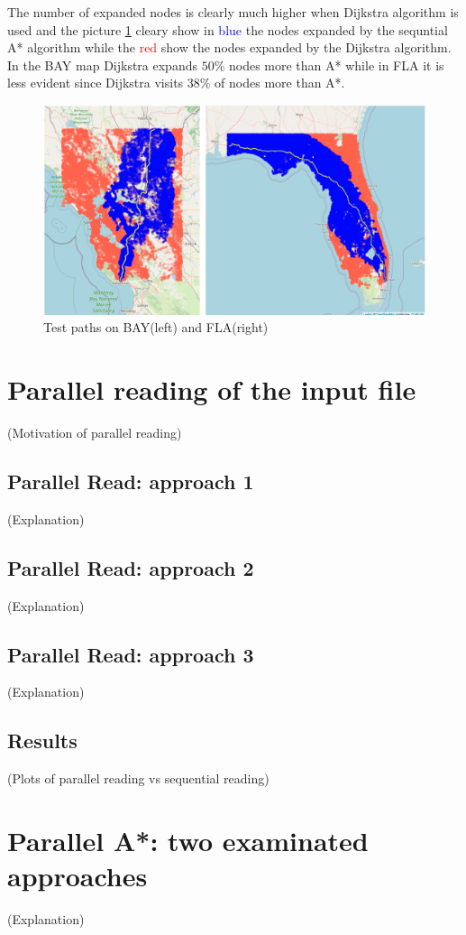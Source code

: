 \documentclass[twocolumn, switch]{article} %
\begin{document}
The number of expanded nodes is clearly much higher when Dijkstra algorithm is used and the picture
\ref{astardijkstra} cleary show in \textcolor{blue}{blue} the nodes expanded by the sequntial A* algorithm
while the \textcolor{red}{red} show the nodes expanded by the Dijkstra algorithm. In the BAY map Dijkstra
expands $50\%$ nodes more than A* while in FLA it is less evident since Dijkstra visits $38\%$ of nodes
more than A*.
\begin{figure}[ht!]
  \centering
  \includegraphics[width=1\linewidth]{dijkstra_astar.png}
  \caption{Test paths on BAY(left) and FLA(right)}
  \label{astardijkstra}
\end{figure}

\section{Parallel reading of the input file}
(Motivation of parallel reading)
\subsection{Parallel Read: approach 1}
(Explanation)
\subsection{Parallel Read: approach 2}
(Explanation)
\subsection{Parallel Read: approach 3}
(Explanation)
\subsection{Results}
(Plots of parallel reading vs sequential reading)

\section{Parallel A*: two examinated approaches}
(Explanation)
\end{document}
